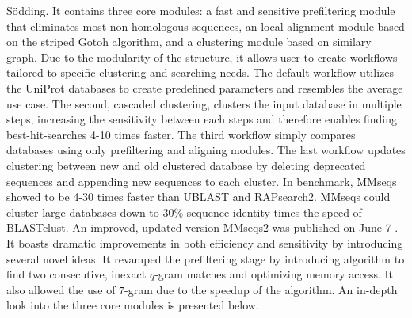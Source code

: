 \documentclass[twoside,a4paper,bsc]{master}
\newcommand{\Qgram}[1]{\(#1\)-gram}
\begin{document}
S\"odding.
It contains three core modules: a fast and sensitive preﬁltering module
that eliminates most non-homologous sequences, an local alignment module
based on the striped Gotoh algorithm, and a clustering module based on
similary graph. Due to the modularity of the structure, it allows user to
create workflows tailored to specific clustering and searching needs. The
default workflow utilizes the UniProt databases to create predefined
parameters and resembles the average use case. The second, cascaded
clustering, clusters the input database in multiple steps, increasing the
sensitivity between each steps and therefore enables finding
best-hit-searches 4-10 times faster. The third workflow simply compares
databases using only prefiltering and aligning modules. The last workflow
updates clustering between new and old clustered database by deleting
deprecated sequences and appending new sequences to each cluster.
In benchmark, MMseqs showed to be 4-30 times faster than UBLAST and
RAPsearch2. MMseqs could cluster large databases down to 30\% sequence
identity  times the speed of BLASTclust.
An improved, updated version MMseqs2 was published on June 7
 . It
boasts dramatic improvements in both efficiency and sensitivity by
introducing several novel ideas. It revamped the prefiltering stage by
introducing algorithm to find two consecutive, inexact \Qgram{q} matches
and optimizing memory access. It also allowed the use of \Qgram{7} due to
the speedup of the algorithm. %
An in-depth look into the three core modules is presented below.
\end{document}
